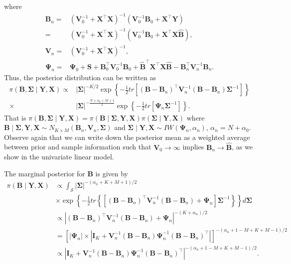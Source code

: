 where 
\begin{align*}
	{\bm{B}}_n = &({\bm{V}}_{0}^{-1}+{\bm{X}}^{\top}{\bm{X}})^{-1}({\bm{V}}_{0}^{-1}{\bm{B}}_{0}+{\bm{X}}^{\top}{\bm{Y}})\\
	=&({\bm{V}}_{0}^{-1}+{\bm{X}}^{\top}{\bm{X}})^{-1}({\bm{V}}_{0}^{-1}{\bm{B}}_{0}+{\bm{X}}^{\top}{\bm{X}}\widehat{\bm{B}}),\\
	{\bm{V}}_n = &({\bm{V}}_{0}^{-1}+{\bm{X}}^{\top}{\bm{X}})^{-1},\\
	{\bm{\Psi}}_n= &{\bm{\Psi}}_{0}+{\bm{S}}+{\bm{B}}_{0}^{\top}{\bm{V}}_{0}^{-1}{\bm{B}}_{0}+\widehat{\bm{B}}^{\top}{\bm{X}}^{\top}{\bm{X}}\widehat{\bm{B}}-{\bm{B}}_n^{\top}{\bm{V}}_n^{-1}{\bm{B}}_n.
\end{align*}
Thus, the posterior distribution can be written as
\begin{align*}
	\pi({\bm{B}},{\bm \Sigma}\mid  {\bm{Y}}, {\bm{X}})\propto &\left|{\bm \Sigma} \right|^{-K/2}\exp\left\lbrace -\frac{1}{2} tr\left[({\bm{B}}-{\bm{B}}_n)^{\top}{\bm{V}}_n^{-1}({\bm{B}}-{\bm{B}}_n)   {\bm \Sigma}^{-1}\right]\right\rbrace \\
	\times & \left|{\bm \Sigma} \right|^{-\frac{N+\alpha_{0}+M+1}{2}}\exp\left\lbrace -\frac{1}{2} tr \left[ {\bm{\Psi}}_n{\bm \Sigma}^{-1}\right] \right\rbrace .
\end{align*}
That is $\pi({\bm{B}},{\bm \Sigma}\mid  {\bm{Y}}, {\bm{X}})=\pi ({\bm{B}}\mid  {\bm \Sigma},{\bm{Y}},{\bm{X}})\pi({\bm \Sigma}\mid  {\bm{Y}},{\bm{X}})$ where ${\bm{B}}\mid  {\bm \Sigma},{\bm{Y}}, {\bm{X}} \sim N_{K\times M}({\bm{B}}_n,{\bm{V}}_n,{\bm \Sigma})$ and ${\bm \Sigma}\mid  {\bm{Y}},{\bm{X}} \sim IW({\bm{\Psi}}_n,{\alpha}_n)$, $\alpha_n= N+\alpha_{0}$. Observe again that we can write down the posterior mean as a weighted average between prior and sample information such that ${\bm{V}}_0\rightarrow\infty$ implies ${\bm{B}}_n\rightarrow\hat{{\bm{B}}}$, as we show in the univariate linear model.

The marginal posterior for ${\bm{B}}$ is given by
\begin{align*}
	\pi({\bm{B}}\mid {\bm{Y}},{\bm{X}})&\propto \int_{\bm{\mathcal{S}}} \left|{\bm \Sigma} \right|^{-(\alpha_n+K+M+1)/2}\\
	&\times\exp\left\lbrace -\frac{1}{2} tr\left\{\left[({\bm{B}}-{\bm{B}}_n)^{\top}{\bm{V}}_n^{-1}({\bm{B}}-{\bm{B}}_n)+{\bm{\Psi}}_n \right]  {\bm \Sigma}^{-1}\right\}\right\rbrace d{\bm{\Sigma}} \\
 	&\propto|({\bm{B}}-{\bm{B}}_n)^{\top}{\bm{V}}_n^{-1}({\bm{B}}-{\bm{B}}_n)+{\bm{\Psi}}_n|^{-(K+\alpha_n)/2}\\
 	&=\left[|{\bm{\Psi}}_n|\times|{\bm{I}}_K+{\bm{V}}_n^{-1}({\bm{B}}-{\bm{B}}_n){\bm{\Psi}}_n^{-1}({\bm{B}}-{\bm{B}}_n)^{\top}|\right]^{-(\alpha_n+1-M+K+M-1)/2}\\
 	&\propto|{\bm{I}}_K+{\bm{V}}_n^{-1}({\bm{B}}-{\bm{B}}_n){\bm{\Psi}}_n^{-1}({\bm{B}}-{\bm{B}}_n)^{\top}|^{-(\alpha_n+1-M+K+M-1)/2}.
\end{align*}

